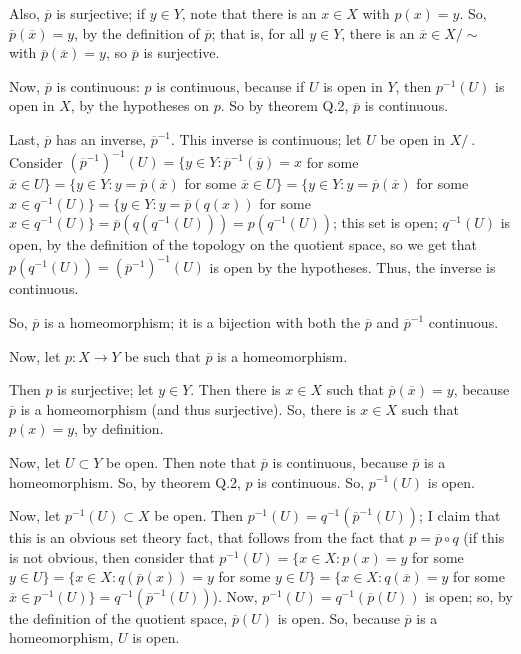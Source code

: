 \documentclass[a4paper,12pt]{article}
\begin{document}
Also, $\overline{p}$ is surjective; if $y \in Y$, note that there is an $x \in X$ with $p(x) = y$. So, $\overline{p}(\overline{x}) = y$, by the definition of $\overline{p}$; that is, for all $y \in Y$, there is an $\overline{x} \in X/\sim$ with $\overline{p}(\overline{x}) = y$, so $\overline{p}$ is surjective. 

Now, $\overline{p}$ is continuous: $p$ is continuous, because if $U$ is open in $Y$, then $p^{-1}(U)$ is open in $X$, by the hypotheses on $p$. So by theorem Q.2, $\overline{p}$ is continuous.

Last, $\overline{p}$ has an inverse, $\overline{p}^{-1}$. This inverse is continuous; let $U$ be open in $X/~$. Consider $(\overline{p}^{-1})^{-1}(U) = \{y \in Y: \overline{p}^{-1}(\overline{y}) = x$ for some $\overline{x} \in U \} = \{y \in Y: y= \overline{p}(\overline{x})$ for some $\overline{x} \in U\}= \{y \in Y: y= \overline{p}(\overline{x})$ for some $x \in q^{-1}(U)\} = \{y \in Y: y= \overline{p}(q(x))$ for some $x \in q^{-1}(U)\} = \overline{p}(q(q^{-1}(U))) = p(q^{-1}(U))$; this set is open; $q^{-1}(U)$ is open, by the definition of the topology on the quotient space, so we get that $p(q^{-1}(U)) =(\overline{p}^{-1})^{-1}(U) $ is open by the hypotheses. Thus, the inverse is continuous.

So, $\overline{p}$ is a homeomorphism; it is a bijection with both the $\overline{p}$ and $\overline{p}^{-1}$ continuous.

Now, let $p: X \to Y$ be such that $\overline{p}$ is a homeomorphism.

Then $p$ is surjective; let $y \in Y$. Then there is $x \in X$ such that $\overline{p}(\overline{x}) = y$, because $\overline{p}$ is a homeomorphism (and thus surjective). So, there is $x \in X$ such that $p(x) = y$, by definition.

Now, let $U \subset Y$ be open. Then note that $\overline{p}$ is continuous, because $\overline{p}$ is a homeomorphism. So, by theorem Q.2, $p$ is continuous. So, $p^{-1}(U)$ is open.

Now, let $p^{-1}(U) \subset X$ be open. Then $p^{-1}(U) = q^{-1}(\overline{p}^{-1}(U))$; I claim that this is an obvious set theory fact, that follows from the fact that $p=\overline{p} \circ q$ (if this is not obvious, then consider that $p^{-1}(U) = \{x \in X: p(x) = y$ for some $y \in U\}= \{x \in X: q(\overline{p}(x)) = y$ for some $y \in U\} = \{x \in X: q(\overline{x}) = y$ for some $\overline{x} \in p^{-1}(U)\}=q^{-1}(\overline{p}^{-1}(U))$). Now, $p^{-1}(U) = q^{-1}(\overline{p}(U))$ is open; so, by the definition of the quotient space, $\overline{p}(U)$ is open. So, because $\overline{p}$ is a homeomorphism, $U$ is open.
\end{document}
